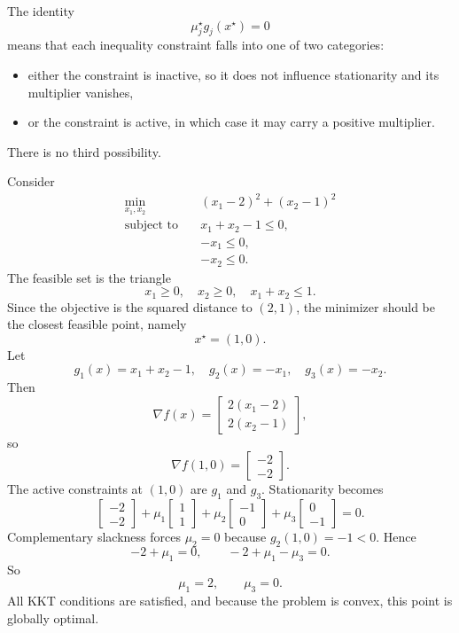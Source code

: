 \begin{remark}
	The identity
	\[
		\mu_j^\star g_j(x^\star)=0
	\]
	means that each inequality constraint falls into one of two categories:
	\begin{itemize}
		\item either the constraint is inactive, so it does not influence stationarity and its multiplier vanishes,
		\item or the constraint is active, in which case it may carry a positive multiplier.
	\end{itemize}
	There is no third possibility.
\end{remark}

\begin{eg}
	Consider
	\begin{align*}
		\min_{x_1,x_2}\quad & (x_1-2)^2+(x_2-1)^2 \\
		\text{subject to}\quad & x_1+x_2-1 \le 0, \\
		                       & -x_1 \le 0, \\
		                       & -x_2 \le 0.
	\end{align*}
	The feasible set is the triangle
	\[
		x_1\ge 0,\quad x_2\ge 0,\quad x_1+x_2\le 1.
	\]
	Since the objective is the squared distance to $(2,1)$, the minimizer should be the closest feasible point, namely
	\[
		x^\star=(1,0).
	\]
	Let
	\[
		g_1(x)=x_1+x_2-1,
		\quad
		g_2(x)=-x_1,
		\quad
		g_3(x)=-x_2.
	\]
	Then
	\[
		\nabla f(x)=
		\begin{bmatrix}
			2(x_1-2) \\
			2(x_2-1)
		\end{bmatrix},
	\]
	so
	\[
		\nabla f(1,0)=
		\begin{bmatrix}
			-2 \\
			-2
		\end{bmatrix}.
	\]
	The active constraints at $(1,0)$ are $g_1$ and $g_3$. Stationarity becomes
	\[
		\begin{bmatrix}
			-2 \\
			-2
		\end{bmatrix}
		+\mu_1
		\begin{bmatrix}
			1 \\
			1
		\end{bmatrix}
		+\mu_2
		\begin{bmatrix}
			-1 \\
			0
		\end{bmatrix}
		+\mu_3
		\begin{bmatrix}
			0 \\
			-1
		\end{bmatrix}
		=0.
	\]
	Complementary slackness forces $\mu_2=0$ because $g_2(1,0)=-1<0$. Hence
	\[
		-2+\mu_1=0,
		\qquad
		-2+\mu_1-\mu_3=0.
	\]
	So
	\[
		\mu_1=2,
		\qquad
		\mu_3=0.
	\]
	All KKT conditions are satisfied, and because the problem is convex, this point is globally optimal.
\end{eg}

